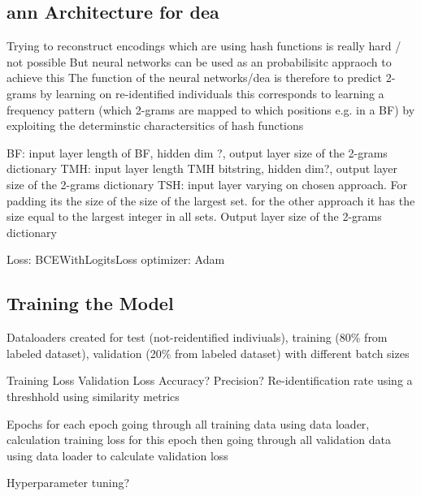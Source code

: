 \subsection{\ac{ann} Architecture for \ac{dea}} \label{sec:architecture}
Trying to reconstruct encodings which are using hash functions is really hard / not possible
But neural networks  can be used as an probabilisitc appraoch to achieve this
The function of the neural networks/dea is therefore to predict 2-grams by learning on re-identified individuals
this corresponds to learning a frequency pattern (which 2-grams are mapped to which positions e.g. in a BF) by exploiting the determinstic charactersitics of hash functions


BF: input layer length of BF, hidden dim ?, output layer size of the 2-grams dictionary
TMH: input layer length TMH bitstring, hidden dim?, output layer size of the 2-grams dictionary
TSH: input layer varying on chosen approach. For padding its the size of the size of the largest set. for the other approach it has the size equal to the largest integer in all sets. Output layer size of the 2-grams dictionary

Loss: BCEWithLogitsLoss
optimizer: Adam

\subsection{Training the Model} \label{sec:training}
Dataloaders created for test (not-reidentified indiviuals), training (80\% from labeled dataset), validation (20\% from labeled dataset) with different batch sizes

Training Loss
Validation Loss
Accuracy?
Precision?
Re-identification rate using a threshhold using similarity metrics

Epochs
for each epoch going through all training data using data loader, calculation training loss for this epoch then going through all validation data using data loader to calculate validation loss


Hyperparameter tuning?




